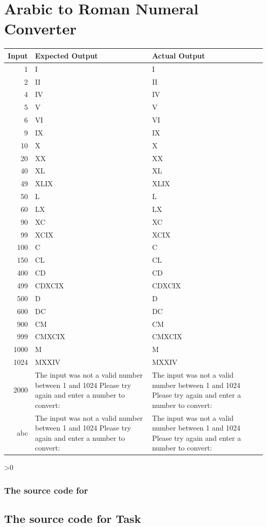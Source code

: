 \documentclass[12pt,a4paper,onesided]{report}
\newcommand{\source}{\pagebreak
	\ifnum\value{section}>0
		\subsection{The source code for \thesection}

	\else
		\section{The source code for Task \thechapter}

	\fi
	}
\begin{document}
\chapter{Arabic to Roman Numeral Converter}
\vspace{-3em}
	\begin{tabular}{rp{38ex}p{38ex}}
		\toprule Input & Expected Output & Actual Output\\
		\midrule
		1 & I & I\\
		2 & II & II\\
		4 & IV & IV\\
		5 & V & V\\
		6 & VI & VI \\
		9 & IX & IX \\
		10 & X & X \\
		20 & XX & XX \\
		40 & XL & XL\\
		49 & XLIX & XLIX\\
		50 & L & L \\
		60 & LX & LX \\
		90 & XC & XC \\
		99 & XCIX & XCIX \\
		100 & C & C\\ 
		150 & CL & CL \\
		400 & CD & CD \\
		499 & CDXCIX & CDXCIX \\
		500 & D & D\\
		600 & DC & DC\\
		900 & CM & CM\\
		999 & CMXCIX & CMXCIX\\
		1000& M & M\\
		1024& MXXIV & MXXIV\\
		2000& The input was not a valid number between 1 and 1024 Please try again and enter a number to convert: &  The input was not a valid number between 1 and 1024 Please try again and enter a number to convert:\\
		abc& The input was not a valid number between 1 and 1024 Please try again and enter a number to convert: &  The input was not a valid number between 1 and 1024 Please try again and enter a number to convert:\\
				
		\bottomrule
				
	\end{tabular}
\source

\end{document}
